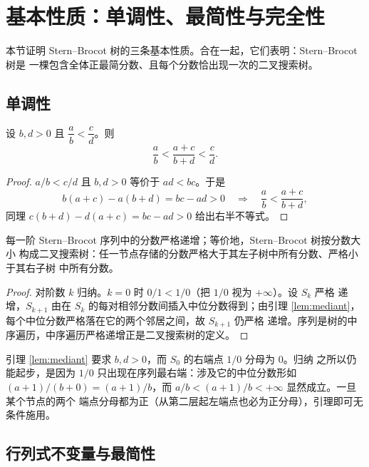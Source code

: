 \section{基本性质：单调性、最简性与完全性}\label{sec:properties}

本节证明 Stern--Brocot 树的三条基本性质。合在一起，它们表明：Stern--Brocot 树是
一棵包含全体正最简分数、且每个分数恰出现一次的二叉搜索树。

\subsection{单调性}

\begin{lemma}[中位分数严格居中]\label{lem:mediant}
设 $b,d>0$ 且 $\dfrac ab<\dfrac cd$。则
\[
  \frac ab<\frac{a+c}{b+d}<\frac cd.
\]
\end{lemma}

\begin{proof}
$a/b<c/d$ 且 $b,d>0$ 等价于 $ad<bc$。于是
\[
  b(a+c)-a(b+d)=bc-ad>0
  \quad\Longrightarrow\quad
  \frac ab<\frac{a+c}{b+d},
\]
同理 $c(b+d)-d(a+c)=bc-ad>0$ 给出右半不等式。
\end{proof}

\begin{proposition}[单调性]\label{prop:monotone}
每一阶 Stern--Brocot 序列中的分数严格递增；等价地，Stern--Brocot 树按分数大小
构成二叉搜索树：任一节点存储的分数严格大于其左子树中所有分数、严格小于其右子树
中所有分数。
\end{proposition}

\begin{proof}
对阶数 $k$ 归纳。$k=0$ 时 $0/1<1/0$（把 $1/0$ 视为 $+\infty$）。设 $S_k$ 严格
递增，$S_{k+1}$ 由在 $S_k$ 的每对相邻分数间插入中位分数得到；由引理
\ref{lem:mediant}，每个中位分数严格落在它的两个邻居之间，故 $S_{k+1}$ 仍严格
递增。序列是树的中序遍历，中序遍历严格递增正是二叉搜索树的定义。
\end{proof}

\begin{remark}
引理 \ref{lem:mediant} 要求 $b,d>0$，而 $S_0$ 的右端点 $1/0$ 分母为 $0$。归纳
之所以仍能起步，是因为 $1/0$ 只出现在序列最右端：涉及它的中位分数形如
$(a+1)/(b+0)=(a+1)/b$，而 $a/b<(a+1)/b<+\infty$ 显然成立。一旦某个节点的两个
端点分母都为正（从第二层起左端点也必为正分母），引理即可无条件施用。
\end{remark}

\subsection{行列式不变量与最简性}

